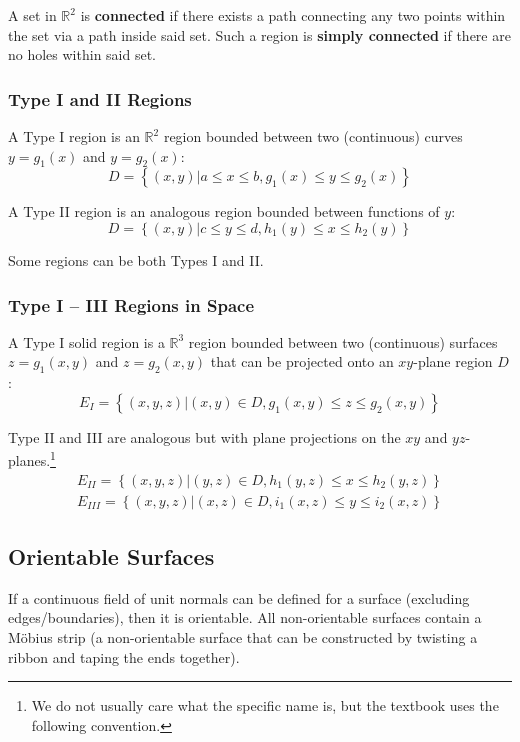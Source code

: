 \documentclass{article}
\begin{document}
A set in $\mathbb{R}^2$ is \textbf{connected} if there exists a path connecting any two points within the set via a path inside said set. Such a region is \textbf{simply connected} if there are no holes within said set.

\subsubsection{Type I and II Regions}
A Type I region is an $\mathbb{R}^2$ region bounded between two (continuous) curves $y=g_1(x)$ and $y=g_2(x)$:
$$D=\left\{(x,y)|a\le x\le b, g_1(x)\le y\le g_2(x)\right\}$$

A Type II region is an analogous region bounded between functions of $y$:
$$D=\left\{(x,y)|c\le y\le d, h_1(y)\le x\le h_2(y)\right\}$$

Some regions can be both Types I and II.

\subsubsection{Type I -- III Regions in Space}
A Type I solid region is a $\mathbb{R}^3$ region bounded between two (continuous) surfaces $z=g_1(x,y)$ and $z=g_2(x,y)$ that can be projected onto an $xy$-plane region $D$:
$$E_I=\left\{(x,y,z)|(x,y)\in D, g_1(x,y)\le z \le g_2(x,y)\right\}$$

Type II and III are analogous but with plane projections on the $xy$ and $yz$-planes.\footnote{We do not usually care what the specific name is, but the textbook uses the following convention.}
\begin{align*}
E_{II}=\left\{(x,y,z)|(y,z)\in D, h_1(y,z)\le x \le h_2(y,z)\right\}\\
E_{III}=\left\{(x,y,z)|(x,z)\in D, i_1(x,z)\le y \le i_2(x,z)\right\}
\end{align*}

\subsection{Orientable Surfaces}
If a continuous field of unit normals can be defined for a surface (excluding edges/boundaries), then it is orientable. All non-orientable surfaces contain a Möbius strip (a non-orientable surface that can be constructed by twisting a ribbon and taping the ends together).
\end{document}
